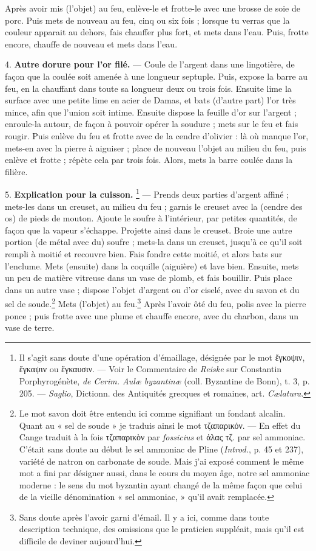 \documentclass[a4paper, 11pt, oneside, polutonikogreek, french]{article}
\begin{document}
Après avoir mis (l'objet) au feu, enlève-le et frotte-le avec une brosse de soie de porc. Puis mets de nouveau au feu, cinq ou six fois ; lorsque tu verras que la couleur apparait au dehors, fais chauffer plus fort, et mets dans l'eau. Puis, frotte encore, chauffe de nouveau et mets dans l'eau.

4. \textbf{Autre dorure pour l'or filé.} --- Coule de l'argent dans une lingotière, de façon que la coulée soit amenée à une longueur septuple. Puis, expose la barre au feu, en la chauffant dans toute sa longueur deux ou trois fois. Ensuite lime la surface avec une petite lime en acier de Damas, et bats (d'autre part) l'or très mince, afin que l'union soit intime. Ensuite dispose la feuille d'or sur l'argent ; enroule-la autour, de façon à pouvoir opérer la soudure ; mets sur le feu et fais rougir. Puis enlève du feu et frotte avec de la cendre d'olivier : là où manque l'or, mets-en avec la pierre à aiguiser ; place de nouveau l'objet au milieu du feu, puis enlève et frotte ; répète cela par trois fois. Alors, mets la barre coulée dans la filière.

5. \textbf{Explication pour la cuisson.} \footnote{Il s'agit sans doute d'une opération d'émaillage, désignée par le mot ἔγκοψιν, ἔγκαψιν ou ἔγκαυσιν. --- Voir le Commentaire de \emph{Reiske} sur Constantin Porphyrogénète, \emph{de Cerim. Aulæ byzantinæ} (coll. Byzantine de Bonn), t. 3, p. 205. --- \emph{Saglio}, Dictionn. des Antiquités grecques et romaines, art. \emph{Cælatura}.} --- Prends deux parties d'argent affiné ; mets-les dans un creuset, au milieu du feu ; garnis le creuset avec la (cendre des os) de pieds de mouton. Ajoute le soufre à l'intérieur, par petites quantités, de façon que la vapeur s'échappe. Projette ainsi dans le creuset. Broie une autre portion (de métal avec du) soufre ; mets-la dans un creuset, jusqu'à ce qu'il soit rempli à moitié et recouvre bien. Fais fondre cette moitié, et alors bats sur l'enclume. Mets (ensuite) dans la coquille (aiguière) et lave bien. Ensuite, mets un peu de matière vitreuse dans un vase de plomb, et fais bouillir. Puis place dans un autre vase ; dispose l'objet d'argent ou d'or ciselé, avec du savon et du sel de soude.\footnote{Le mot savon doit être entendu ici comme signifiant un fondant alcalin. Quant au « sel de soude » je traduis ainsi le mot τζαπαρικόν. --- En effet du Cange traduit à la fois τζαπαρικὸν par \emph{fossicius} et ἀλας τζ. par sel ammoniac. C'était sans doute au début le sel ammoniac de Pline (\emph{Introd.}, p. 45 et 237), variété de natron on carbonate de soude. Mais j'ai exposé comment le même mot a fini par désigner aussi, dans le cours du moyen âge, notre sel ammoniac moderne : le sens du mot byzantin ayant changé de la même façon que celui de la vieille dénomination « sel ammoniac, » qu'il avait remplacée.} Mets (l'objet) au feu.\footnote{Sans doute après l'avoir garni d'émail. Il y a ici, comme dans toute description technique, des omissions que le praticien suppléait, mais qu'il est difficile de deviner aujourd'hui.} Après l'avoir ôté du feu, polis avec la pierre ponce ; puis frotte avec une plume et chauffe encore, avec du charbon, dans un vase de terre.
\end{document}
